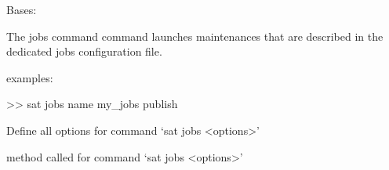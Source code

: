 \documentclass[a4paper,10pt,english]{sphinxmanual}
\begin{document}
\begin{fulllineitems}
\label{\detokenize{apidoc_commands/commands:commands.jobs.Command}}
Bases: 

The jobs command command launches maintenances that are described in 
the dedicated jobs configuration file.

\begin{DUlineblock}{0em}
\item[] examples:
\item[] \textgreater{}\textgreater{} sat jobs \textendash{}name my\_jobs \textendash{}publish
\end{DUlineblock}

\begin{fulllineitems}
\label{\detokenize{apidoc_commands/commands:commands.jobs.Command.getParser}}
Define all options for command ‘sat jobs \textless{}options\textgreater{}’

\end{fulllineitems}


\begin{fulllineitems}
\label{\detokenize{apidoc_commands/commands:commands.jobs.Command.name}}
\end{fulllineitems}


\begin{fulllineitems}
\label{\detokenize{apidoc_commands/commands:commands.jobs.Command.run}}
method called for command ‘sat jobs \textless{}options\textgreater{}’

\end{fulllineitems}


\end{fulllineitems}

\end{document}
